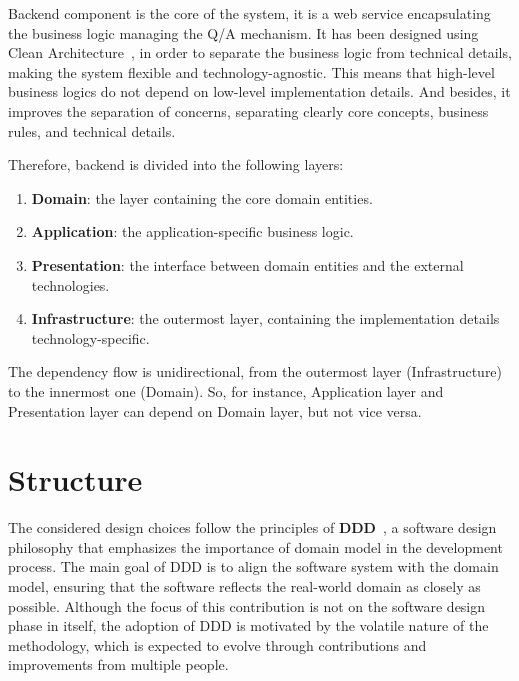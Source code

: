 \documentclass[12pt,a4paper,openright,twoside]{book}
\begin{document}
Backend component is the core of the system, it is a web service encapsulating the business logic managing the \ac{Q/A} mechanism.
%
It has been designed using Clean Architecture~\cite{martin2017clean}, in order to separate the business logic from technical details, making the system flexible and technology-agnostic.
%
This means that high-level business logics do not depend on low-level implementation details.
%
And besides, it improves the separation of concerns, separating clearly core concepts, business rules, and technical details.

Therefore, backend is divided into the following layers:

\begin{enumerate}
    \item \textbf{Domain}: the layer containing the core domain entities.
    \item \textbf{Application}: the application-specific business logic.
    \item \textbf{Presentation}: the interface between domain entities and the external technologies.
    \item \textbf{Infrastructure}: the outermost layer, containing the implementation details technology-specific.
\end{enumerate}

% 
The dependency flow is unidirectional, from the outermost layer (Infrastructure) to the innermost one (Domain).
%
So, for instance, Application layer and Presentation layer can depend on Domain layer, but not vice versa.
%

\section{Structure}
%
The considered design choices follow the principles of \textbf{\acf{DDD}}~\cite{millett2015ddd}, a software design philosophy that emphasizes the importance of domain model in the development process.
%
The main goal of \ac{DDD} is to align the software system with the domain model, ensuring that the software reflects the real-world domain as closely as possible.
%
Although the focus of this contribution is not on the software design phase in itself, the adoption of \ac{DDD} is motivated by the volatile nature of the methodology, which is expected to evolve through contributions and improvements from multiple people.

\end{document}

